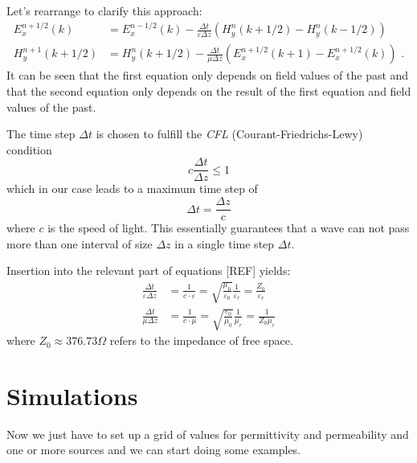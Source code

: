 \documentclass[]{report}
\begin{document}
Let's rearrange to clarify this approach:
\begin{align}
	E_x^{n+1/2}(k) &= E_x^{n-1/2}(k) - \frac{\Delta t}{\varepsilon \Delta z}\left( H_y^n(k+1/2) - H_y^n(k-1/2) \right) \\
	H_y^{n+1}(k+1/2) &= H_y^n(k+1/2) - \frac{\Delta t}{\mu \Delta z}\left( E_x^{n+1/2}(k+1) - E_x^{n+1/2}(k) \right) \text{ .}
\end{align}
It can be seen that the first equation only depends on field values of the past and that the second equation only depends on the result of the first equation and field values of the past.

The time step \( \Delta t \) is chosen to fulfill the \textit{CFL} (Courant-Friedrichs-Lewy) condition
\begin{equation}
	c \frac{\Delta t}{\Delta z} \leq 1
\end{equation}
which in our case leads to a maximum time step of
\begin{equation}
	\Delta t = \frac{\Delta z}{c}
\end{equation}
where \( c \) is the speed of light. This essentially guarantees that a wave can not pass more than one interval of size \( \Delta z \) in a single time step \( \Delta t \).

Insertion into the relevant part of equations [REF] yields:
\begin{align}
	\frac{\Delta t}{\varepsilon \Delta z} &= \frac{1}{c \cdot \varepsilon} = \sqrt{\frac{\mu_0}{\varepsilon_0}} \frac{1}{\varepsilon_r} = \frac{Z_0}{\varepsilon_r} \\
	\frac{\Delta t}{\mu \Delta z} &= \frac{1}{c \cdot \mu} = \sqrt{\frac{\varepsilon_0}{\mu_0}} \frac{1}{\mu_r} = \frac{1}{Z_0 \mu_r}
\end{align}
where \( Z_0 \approx 376.73 \Omega \) refers to the impedance of free space.

\section{Simulations}
Now we just have to set up a grid of values for permittivity and permeability and one or more sources and we can start doing some examples.

\end{document}
